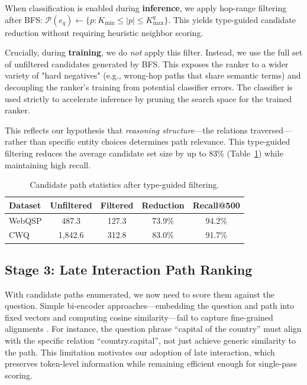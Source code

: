 \documentclass[conference]{IEEEtran}
\begin{document}
When classification is enabled during \textbf{inference}, we apply hop-range filtering after BFS: $\mathcal{P}(e_q)\leftarrow\{p:K_{\text{min}}\le|p|\le K_{\text{max}}^q\}$. This yields type-guided candidate reduction without requiring heuristic neighbor scoring.

Crucially, during \textbf{training}, we do \emph{not} apply this filter. Instead, we use the full set of unfiltered candidates generated by BFS. This exposes the ranker to a wider variety of "hard negatives" (e.g., wrong-hop paths that share semantic terms) and decoupling the ranker's training from potential classifier errors. The classifier is used strictly to accelerate inference by pruning the search space for the trained ranker.

This reflects our hypothesis that \emph{reasoning structure}---the relations traversed---rather than specific entity choices determines path relevance. This type-guided filtering reduces the average candidate set size by up to 83\% (Table~\ref{tab:candidates}) while maintaining high recall.

\begin{table}[t]
\centering
\caption{Candidate path statistics after type-guided filtering.}
\label{tab:candidates}
\begin{tabular}{lcccc}
\toprule
Dataset & Unfiltered & Filtered & Reduction & Recall@500 \\
\midrule
WebQSP & 487.3 & 127.3 & 73.9\% & 94.2\% \\
CWQ & 1,842.6 & 312.8 & 83.0\% & 91.7\% \\
\bottomrule
\end{tabular}
\end{table}

\subsection{Stage 3: Late Interaction Path Ranking}

With candidate paths enumerated, we now need to score them against the question. Simple bi-encoder approaches---embedding the question and path into fixed vectors and computing cosine similarity---fail to capture fine-grained alignments \cite{karpukhin2020dpr}. For instance, the question phrase ``capital of the country'' must align with the specific relation ``country.capital'', not just achieve generic similarity to the path. This limitation motivates our adoption of late interaction, which preserves token-level information while remaining efficient enough for single-pass scoring.
\end{document}
